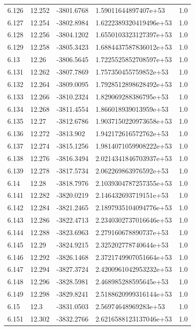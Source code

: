 \begin{tabular}{lllll}
6.126 & 12.252 & -3801.6768 & 1.59011644897407e+53 & 1.0 \\
6.127 & 12.254 & -3802.8984 & 1.6222389320419496e+53 & 1.0 \\
6.128 & 12.256 & -3804.1202 & 1.6550103323127397e+53 & 1.0 \\
6.129 & 12.258 & -3805.3423 & 1.6884437587836012e+53 & 1.0 \\
6.13 & 12.26 & -3806.5645 & 1.7225525852708597e+53 & 1.0 \\
6.131 & 12.262 & -3807.7869 & 1.757350455759852e+53 & 1.0 \\
6.132 & 12.264 & -3809.0095 & 1.7928512898628492e+53 & 1.0 \\
6.133 & 12.266 & -3810.2324 & 1.829069288386795e+53 & 1.0 \\
6.134 & 12.268 & -3811.4554 & 1.866018939013959e+53 & 1.0 \\
6.135 & 12.27 & -3812.6786 & 1.9037150220973658e+53 & 1.0 \\
6.136 & 12.272 & -3813.902 & 1.942172616572762e+53 & 1.0 \\
6.137 & 12.274 & -3815.1256 & 1.9814071059908222e+53 & 1.0 \\
6.138 & 12.276 & -3816.3494 & 2.0214341846703937e+53 & 1.0 \\
6.139 & 12.278 & -3817.5734 & 2.062269863976592e+53 & 1.0 \\
6.14 & 12.28 & -3818.7976 & 2.1039304787257355e+53 & 1.0 \\
6.141 & 12.282 & -3820.0219 & 2.146432693719151e+53 & 1.0 \\
6.142 & 12.284 & -3821.2465 & 2.1897935104094776e+53 & 1.0 \\
6.143 & 12.286 & -3822.4713 & 2.2340302737016646e+53 & 1.0 \\
6.144 & 12.288 & -3823.6963 & 2.279160678890737e+53 & 1.0 \\
6.145 & 12.29 & -3824.9215 & 2.325202778740644e+53 & 1.0 \\
6.146 & 12.292 & -3826.1468 & 2.3721749907051664e+53 & 1.0 \\
6.147 & 12.294 & -3827.3724 & 2.4200961042953232e+53 & 1.0 \\
6.148 & 12.296 & -3828.5981 & 2.468985288595645e+53 & 1.0 \\
6.149 & 12.298 & -3829.8241 & 2.5188620999316144e+53 & 1.0 \\
6.15 & 12.3 & -3831.0503 & 2.56974648969283e+53 & 1.0 \\
6.151 & 12.302 & -3832.2766 & 2.6216588123137046e+53 & 1.0 \\

\end{tabular}
